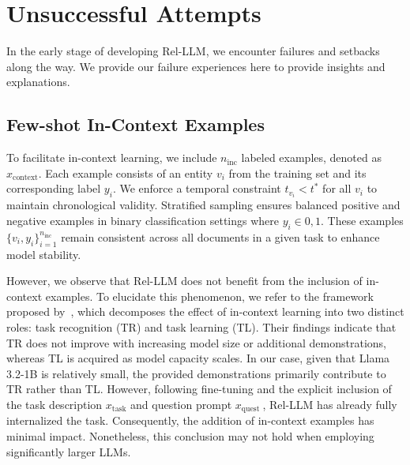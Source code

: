 \documentclass[11pt]{article}
\begin{document}
\section{Unsuccessful Attempts}
In the early stage of developing Rel-LLM, we encounter failures and setbacks along the way. We provide our failure experiences here to provide insights and explanations. 

\subsection{Few-shot In-Context Examples}
\label{app:in-context}
To facilitate in-context learning, we include $n_{\text{inc}}$ labeled examples, denoted as $x_{\mathrm{context}}$. Each example consists of an entity $v_i$ from the training set and its corresponding label $y_i$. We enforce a temporal constraint $t_{v_i} < t^*$ for all $v_i$ to maintain chronological validity. Stratified sampling ensures balanced positive and negative examples in binary classification settings where $y_i \in {0,1}$. These examples $\{v_i,y_i\}_{i=1}^{n_{\text{inc}}}$ remain consistent across all documents in a given task to enhance model stability. 

However, we observe that Rel-LLM does not benefit from the inclusion of in-context examples. To elucidate this phenomenon, we refer to the framework proposed by~\citet{pan2023context}, which decomposes the effect of in-context learning into two distinct roles: task recognition (TR) and task learning (TL). Their findings indicate that TR does not improve with increasing model size or additional demonstrations, whereas TL is acquired as model capacity scales. In our case, given that Llama 3.2-1B is relatively small, the provided demonstrations primarily contribute to TR rather than TL. However, following fine-tuning and the explicit inclusion of the task description $x_{\text{task}}$ and question prompt $x_{\text {quest }}$, Rel-LLM has already fully internalized the task. Consequently, the addition of in-context examples has minimal impact. Nonetheless, this conclusion may not hold when employing significantly larger LLMs.
\end{document}
